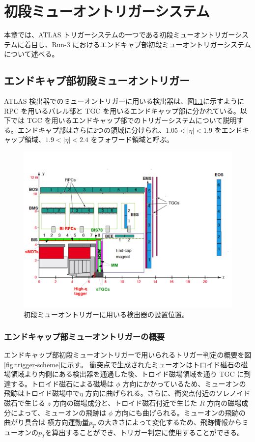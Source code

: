 \chapter{初段ミューオントリガーシステム}
本章では、ATLAS トリガーシステムの一つである初段ミューオントリガーシステムに着目し、Run-3 におけるエンドキャプ部初段ミューオントリガーシステムについて述べる。

\section{エンドキャプ部初段ミューオントリガー}
ATLAS 検出器でのミューオントリガーに用いる検出器は、図\ref{fig:muon}に示すように RPC を用いるバレル部と TGC を用いるエンドキャップ部に分かれている。以下では TGC を用いるエンドキャップ部でのトリガーシステムについて説明する。エンドキャプ部はさらに2つの領域に分けられ、$1.05 < |\eta| < 1.9$ をエンドキャップ領域、$1.9 < |\eta| < 2.4$ をフォワード領域と呼ぶ。
\begin{figure}[tb]
  \centering
  \includegraphics[clip, width=14cm]{fig/2/ch01_fig_03a.pdf}
  \caption{初段ミューオントリガーに用いる検出器の設置位置。}
  \label{fig:muon}
\end{figure}

\subsection{エンドキャップ部ミューオントリガーの概要}\label{section:CW}
エンドキャップ部初段ミューオントリガーで用いられるトリガー判定の概要を図\ref{fig:trigger-scheme}に示す。
衝突点で生成されたミューオンはトロイド磁石の磁場領域より内側にある検出器を通過した後、トロイド磁場領域を通り TGC に到達する。トロイド磁石による磁場は $\phi$ 方向にかかっているため、ミューオンの飛跡はトロイド磁場中で$\eta$ 方向に曲げられる。さらに、衝突点付近のソレノイド磁石で生じる $z$ 方向の磁場成分と、トロイド磁石付近で生じた $R$ 方向の磁場成分によって、ミューオンの飛跡は $\phi$ 方向にも曲げられる。ミューオンの飛跡の曲がり具合は 横方向運動量$p_T$ の大きさによって変化するため、飛跡情報からミューオンの$p_T$を算出することができ、トリガー判定に使用することができる。

